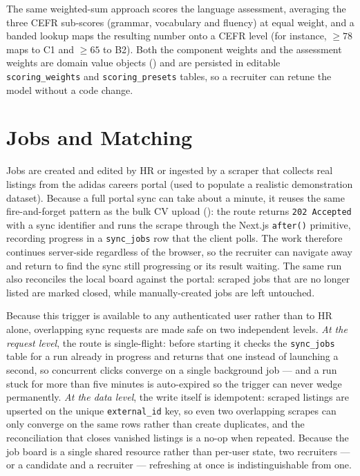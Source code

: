 The same weighted-sum approach scores the language assessment, averaging the
three CEFR sub-scores (grammar, vocabulary and fluency) at equal weight, and a
banded lookup maps the resulting number onto
a CEFR level (for instance, $\geq 78$ maps to C1 and $\geq 65$ to B2). Both
the component weights and the assessment weights are domain value objects
() and are persisted in editable
\texttt{scoring\_weights} and \texttt{scoring\_presets} tables, so a recruiter
can retune the model without a code change.


\section{Jobs and Matching}
\label{sec:impl-jobs}

Jobs are created and edited by HR or ingested by a scraper that collects
real listings from the adidas careers portal (used to populate a realistic
demonstration dataset). Because a full portal sync can take about a minute, it
reuses the same fire-and-forget pattern as the bulk CV upload
(): the route returns \texttt{202\,Accepted} with a
sync identifier and runs the scrape through the Next.js \texttt{after()}
primitive, recording progress in a \texttt{sync\_jobs} row that the client
polls. The work therefore continues server-side regardless of the browser, so
the recruiter can navigate away and return to find the sync still progressing
or its result waiting. The same run also reconciles the local board against
the portal: scraped jobs that are no longer listed are marked closed, while
manually-created jobs are left untouched.

Because this trigger is available to any authenticated user rather than to HR
alone, overlapping sync requests are made safe on two independent levels.
\emph{At the request level}, the route is single-flight: before starting it
checks the \texttt{sync\_jobs} table for a run already in progress and returns
that one instead of launching a second, so concurrent clicks converge on a
single background job --- and a run stuck for more than five minutes is
auto-expired so the trigger can never wedge permanently. \emph{At the data
level}, the write itself is idempotent: scraped listings are upserted on the
unique \texttt{external\_id} key, so even two overlapping scrapes can only
converge on the same rows rather than create duplicates, and the reconciliation
that closes vanished listings is a no-op when repeated. Because the job board
is a single shared resource rather than per-user state, two recruiters --- or a
candidate and a recruiter --- refreshing at once is indistinguishable from one.

